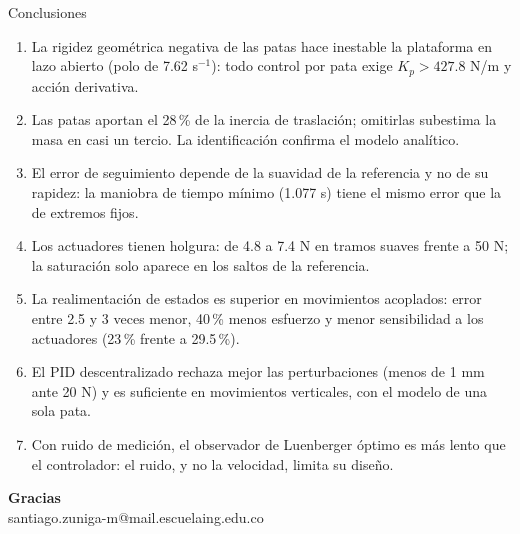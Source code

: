 \documentclass[aspectratio=169,10pt]{beamer}
\begin{document}
\begin{frame}{Conclusiones}
\small
\begin{enumerate}
\setlength{\itemsep}{0.4em}
\item La rigidez geométrica negativa de las patas hace inestable la plataforma en lazo abierto (polo de 7.62 s$^{-1}$): todo control por pata exige $K_p > 427.8$ N/m y acción derivativa.
\item Las patas aportan el 28\,\% de la inercia de traslación; omitirlas subestima la masa en casi un tercio. La identificación confirma el modelo analítico.
\item El error de seguimiento depende de la suavidad de la referencia y no de su rapidez: la maniobra de tiempo mínimo (1.077 s) tiene el mismo error que la de extremos fijos.
\item Los actuadores tienen holgura: de 4.8 a 7.4 N en tramos suaves frente a 50 N; la saturación solo aparece en los saltos de la referencia.
\item La realimentación de estados es superior en movimientos acoplados: error entre 2.5 y 3 veces menor, 40\,\% menos esfuerzo y menor sensibilidad a los actuadores (23\,\% frente a 29.5\,\%).
\item El PID descentralizado rechaza mejor las perturbaciones (menos de 1 mm ante 20 N) y es suficiente en movimientos verticales, con el modelo de una sola pata.
\item Con ruido de medición, el observador de Luenberger óptimo es más lento que el controlador: el ruido, y no la velocidad, limita su diseño.
\end{enumerate}
\end{frame}

\begin{frame}[plain]
\centering
\vspace*{\fill}
{\color{acento}\Huge\bfseries Gracias}\\[1em]
{\color{tenue}santiago.zuniga-m@mail.escuelaing.edu.co}
\vspace*{\fill}
\end{frame}
\end{document}
